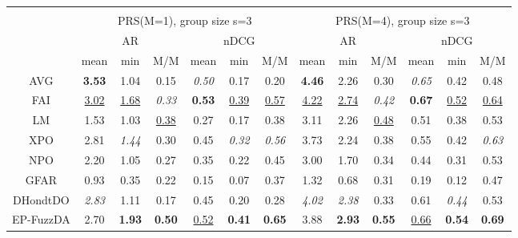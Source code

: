 \begin{tabular}{ c | c c c | c c c || c c c | c c c}
\multicolumn{12}{c}{} \\
\multicolumn{1}{c}{} & \multicolumn{6}{c}{PRS(M=1), group size s=3} & \multicolumn{6}{c}{PRS(M=4), group size s=3} \\
\multicolumn{1}{c}{} & \multicolumn{3}{c}{AR} & \multicolumn{3}{c}{nDCG} & \multicolumn{3}{c}{AR} & \multicolumn{3}{c}{nDCG} \\
& mean & min & M/M & mean & min & M/M & mean & min & M/M & mean & min & M/M \\
\hline
AVG & \textbf{3.53} & 1.04 & 0.15 & \textit{0.50} & 0.17 & 0.20 & \textbf{4.46} & 2.26 & 0.30 & \textit{0.65} & 0.42 & 0.48 \\
FAI & \underline{3.02} & \underline{1.68} & \textit{0.33} & \textbf{0.53} & \underline{0.39} & \underline{0.57} & \underline{4.22} & \underline{2.74} & \textit{0.42} & \textbf{0.67} & \underline{0.52} & \underline{0.64} \\
LM & 1.53 & 1.03 & \underline{0.38} & 0.27 & 0.17 & 0.38 & 3.11 & 2.26 & \underline{0.48} & 0.51 & 0.38 & 0.53 \\
XPO & 2.81 & \textit{1.44} & 0.30 & 0.45 & \textit{0.32} & \textit{0.56} & 3.73 & 2.24 & 0.38 & 0.55 & 0.42 & \textit{0.63} \\
NPO & 2.20 & 1.05 & 0.27 & 0.35 & 0.22 & 0.45 & 3.00 & 1.70 & 0.34 & 0.44 & 0.31 & 0.53 \\
GFAR & 0.93 & 0.35 & 0.22 & 0.15 & 0.07 & 0.37 & 1.32 & 0.68 & 0.31 & 0.19 & 0.12 & 0.47 \\
DHondtDO & \textit{2.83} & 1.11 & 0.17 & 0.45 & 0.20 & 0.28 & \textit{4.02} & \textit{2.38} & 0.33 & 0.61 & \textit{0.44} & 0.53 \\
EP-FuzzDA & 2.70 & \textbf{1.93} & \textbf{0.50} & \underline{0.52} & \textbf{0.41} & \textbf{0.65} & 3.88 & \textbf{2.93} & \textbf{0.55} & \underline{0.66} & \textbf{0.54} & \textbf{0.69} \\


\end{tabular}
